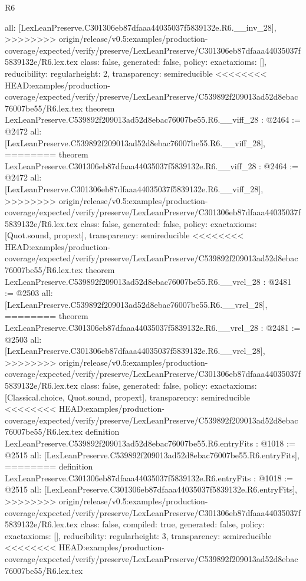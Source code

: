 \begin{lexlean}{R6}
\begin{coremodule}
{{{{{{{{{{{{  all: [LexLeanPreserve.C301306eb87dfaaa44035037f5839132e.R6.__inv_28],
>>>>>>>> origin/release/v0.5:examples/production-coverage/expected/verify/preserve/LexLeanPreserve/C301306eb87dfaaa44035037f5839132e/R6.lex.tex
  class: false,
  generated: false,
  policy: exact{axioms: []},
  reducibility: regular{height: 2},
  transparency: semireducible
}
<<<<<<<< HEAD:examples/production-coverage/expected/verify/preserve/LexLeanPreserve/C539892f209013ad52d8ebac76007be55/R6.lex.tex
theorem LexLeanPreserve.C539892f209013ad52d8ebac76007be55.R6.__viff_28 : @2464 := @2472 {
  all: [LexLeanPreserve.C539892f209013ad52d8ebac76007be55.R6.__viff_28],
========
theorem LexLeanPreserve.C301306eb87dfaaa44035037f5839132e.R6.__viff_28 : @2464 := @2472 {
  all: [LexLeanPreserve.C301306eb87dfaaa44035037f5839132e.R6.__viff_28],
>>>>>>>> origin/release/v0.5:examples/production-coverage/expected/verify/preserve/LexLeanPreserve/C301306eb87dfaaa44035037f5839132e/R6.lex.tex
  class: false,
  generated: false,
  policy: exact{axioms: [Quot.sound, propext]},
  transparency: semireducible
}
<<<<<<<< HEAD:examples/production-coverage/expected/verify/preserve/LexLeanPreserve/C539892f209013ad52d8ebac76007be55/R6.lex.tex
theorem LexLeanPreserve.C539892f209013ad52d8ebac76007be55.R6.__vrel_28 : @2481 := @2503 {
  all: [LexLeanPreserve.C539892f209013ad52d8ebac76007be55.R6.__vrel_28],
========
theorem LexLeanPreserve.C301306eb87dfaaa44035037f5839132e.R6.__vrel_28 : @2481 := @2503 {
  all: [LexLeanPreserve.C301306eb87dfaaa44035037f5839132e.R6.__vrel_28],
>>>>>>>> origin/release/v0.5:examples/production-coverage/expected/verify/preserve/LexLeanPreserve/C301306eb87dfaaa44035037f5839132e/R6.lex.tex
  class: false,
  generated: false,
  policy: exact{axioms: [Classical.choice, Quot.sound, propext]},
  transparency: semireducible
}
<<<<<<<< HEAD:examples/production-coverage/expected/verify/preserve/LexLeanPreserve/C539892f209013ad52d8ebac76007be55/R6.lex.tex
definition LexLeanPreserve.C539892f209013ad52d8ebac76007be55.R6.entryFits : @1018 := @2515 {
  all: [LexLeanPreserve.C539892f209013ad52d8ebac76007be55.R6.entryFits],
========
definition LexLeanPreserve.C301306eb87dfaaa44035037f5839132e.R6.entryFits : @1018 := @2515 {
  all: [LexLeanPreserve.C301306eb87dfaaa44035037f5839132e.R6.entryFits],
>>>>>>>> origin/release/v0.5:examples/production-coverage/expected/verify/preserve/LexLeanPreserve/C301306eb87dfaaa44035037f5839132e/R6.lex.tex
  class: false,
  compiled: true,
  generated: false,
  policy: exact{axioms: []},
  reducibility: regular{height: 3},
  transparency: semireducible
}
<<<<<<<< HEAD:examples/production-coverage/expected/verify/preserve/LexLeanPreserve/C539892f209013ad52d8ebac76007be55/R6.lex.tex
}}}}}}}}}}}}}}
\end{coremodule}
\end{lexlean}
